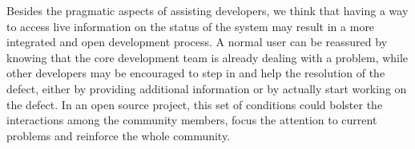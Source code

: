 Besides the pragmatic aspects of assisting developers, we think that having a way to access live information on the status of the system may result in a more integrated and open development process.
A normal user can be reassured by knowing that the core development team is already dealing with a problem, while other developers may be encouraged to step in and help the resolution of the defect, either by providing additional information or by actually start working on the defect.
In an open source project, this set of conditions could bolster the interactions among the community members, focus the attention to current problems and reinforce the whole community.



%
%
